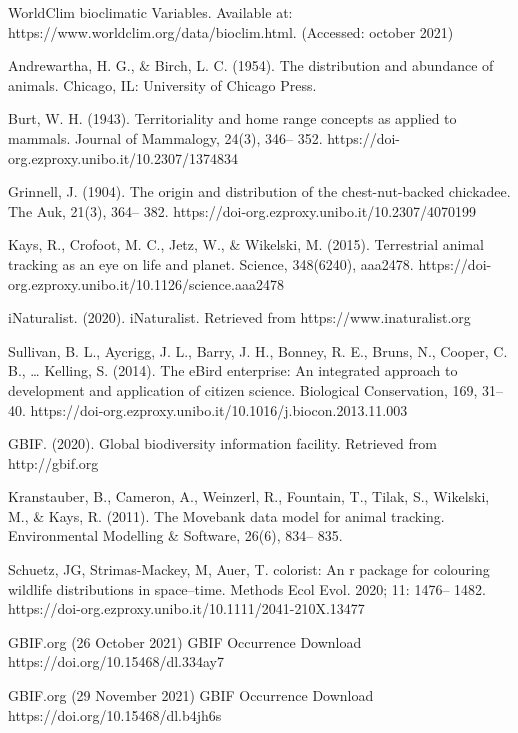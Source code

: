 \documentclass[12pt,a4paper]{article}
\begin{document}
\begin{thebibliography}{999}
WorldClim bioclimatic Variables. Available at: https://www.worldclim.org/data/bioclim.html. (Accessed: october 2021)

Andrewartha, H. G., \& Birch, L. C. (1954). The distribution and abundance of animals. Chicago, IL: University of Chicago Press.

Burt, W. H. (1943). Territoriality and home range concepts as applied to mammals. Journal of Mammalogy, 24(3), 346– 352. https://doi-org.ezproxy.unibo.it/10.2307/1374834

Grinnell, J. (1904). The origin and distribution of the chest-nut-backed chickadee. The Auk, 21(3), 364– 382. https://doi-org.ezproxy.unibo.it/10.2307/4070199

Kays, R., Crofoot, M. C., Jetz, W., \& Wikelski, M. (2015). Terrestrial animal tracking as an eye on life and planet. Science, 348(6240), aaa2478. https://doi-org.ezproxy.unibo.it/10.1126/science.aaa2478

iNaturalist. (2020). iNaturalist. Retrieved from https://www.inaturalist.org

Sullivan, B. L., Aycrigg, J. L., Barry, J. H., Bonney, R. E., Bruns, N., Cooper, C. B., … Kelling, S. (2014). The eBird enterprise: An integrated approach to development and application of citizen science. Biological Conservation, 169, 31– 40. https://doi-org.ezproxy.unibo.it/10.1016/j.biocon.2013.11.003

GBIF. (2020). Global biodiversity information facility. Retrieved from http://gbif.org

Kranstauber, B., Cameron, A., Weinzerl, R., Fountain, T., Tilak, S., Wikelski, M., \& Kays, R. (2011). The Movebank data model for animal tracking. Environmental Modelling & Software, 26(6), 834– 835.

Schuetz, JG, Strimas-Mackey, M, Auer, T. colorist: An r package for colouring wildlife distributions in space–time. Methods Ecol Evol. 2020; 11: 1476– 1482. https://doi-org.ezproxy.unibo.it/10.1111/2041-210X.13477

GBIF.org (26 October 2021) GBIF Occurrence Download  https://doi.org/10.15468/dl.334ay7

GBIF.org (29 November 2021) GBIF Occurrence Download  https://doi.org/10.15468/dl.b4jh6s


\end{thebibliography}
\end{document}
